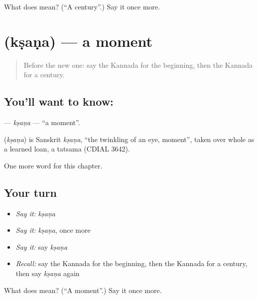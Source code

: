\begin{tcolorbox}[breakable,colback=teal!4,colframe=teal!35!black,title={Before you move on}]
What does  mean? (\textquotedblleft{}A century\textquotedblright{}.) Say it once more.
\end{tcolorbox}
\section[\texorpdfstring{\kn{ಕ್ಷಣ} (kṣaṇa)}{ಕ್ಷಣ (kṣaṇa)}]{ (kṣaṇa) — a moment}

\label{lesson:KA-C172-ksana}



\begin{quote}
Before the new one: say the Kannada for the beginning, then the Kannada for a century.
\end{quote}

\subsection*{You'll want to know: }
\textbf{} — \emph{kṣaṇa} — \textquotedblleft{}a moment\textquotedblright{}.

\begin{cousinweb}
\textbf{} (\emph{kṣaṇa}) is Sanskrit \emph{kṣaṇa}, \textquotedblleft{}the twinkling of an eye, moment\textquotedblright{}, taken over whole as a learned loan, a tatsama (CDIAL 3642).
\end{cousinweb}

\begin{grammarlens}[title={What you've built}]
One more word for this chapter.
\end{grammarlens}

\subsection*{Your turn}
\begin{itemize}
\raggedright
  \item \emph{Say it:} \emph{kṣaṇa}
  \item \emph{Say it:} \emph{kṣaṇa}, once more
  \item \emph{Say it:} say \emph{kṣaṇa}
  \item \emph{Recall:} say the Kannada for the beginning, then the Kannada for a century, then say \emph{kṣaṇa} again
\end{itemize}

\begin{tcolorbox}[breakable,colback=teal!4,colframe=teal!35!black,title={Before you move on}]
What does  mean? (\textquotedblleft{}A moment\textquotedblright{}.) Say it once more.
\end{tcolorbox}
